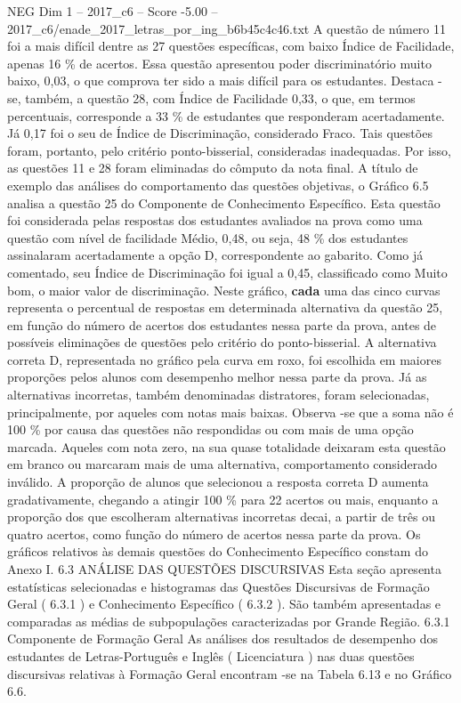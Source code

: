 \begin{textsample}{NEG Dim 1 – 2017\_c6 – Score -5.00 – 2017\_c6/enade\_2017\_letras\_por\_ing\_b6b45c4c46.txt}
A questão de número 11 foi a mais difícil dentre as 27 questões específicas, com baixo Índice de Facilidade, apenas 16 \% de acertos.
Essa questão apresentou poder discriminatório muito baixo, 0,03, o que comprova ter sido a mais difícil para os estudantes.
Destaca -se, também, a questão 28, com Índice de Facilidade 0,33, o que, em termos percentuais, corresponde a 33 \% de estudantes que responderam acertadamente.
Já 0,17 foi o seu de Índice de Discriminação, considerado Fraco.
Tais questões foram, portanto, pelo critério ponto-bisserial, consideradas inadequadas.
Por isso, as questões 11 e 28 foram eliminadas do cômputo da nota final.
A título de exemplo das análises do comportamento das questões objetivas, o Gráfico 6.5 analisa a questão 25 do Componente de Conhecimento Específico.
Esta questão foi considerada pelas respostas dos estudantes avaliados na prova como uma questão com nível de facilidade Médio, 0,48, ou seja, 48 \% dos estudantes assinalaram acertadamente a opção D, correspondente ao gabarito.
Como já comentado, seu Índice de Discriminação foi igual a 0,45, classificado como Muito bom, o maior valor de discriminação.
Neste gráfico, \textbf{cada} uma das cinco curvas representa o percentual de respostas em determinada alternativa da questão 25, em função do número de acertos dos estudantes nessa parte da prova, antes de possíveis eliminações de questões pelo critério do ponto-bisserial.
A alternativa correta D, representada no gráfico pela curva em roxo, foi escolhida em maiores proporções pelos alunos com desempenho melhor nessa parte da prova.
Já as alternativas incorretas, também denominadas distratores, foram selecionadas, principalmente, por aqueles com notas mais baixas.
Observa -se que a soma não é 100 \% por causa das questões não respondidas ou com mais de uma opção marcada.
Aqueles com nota zero, na sua quase totalidade deixaram esta questão em branco ou marcaram mais de uma alternativa, comportamento considerado inválido.
A proporção de alunos que selecionou a resposta correta D aumenta gradativamente, chegando a atingir 100 \% para 22 acertos ou mais, enquanto a proporção dos que escolheram alternativas incorretas decai, a partir de três ou quatro acertos, como função do número de acertos nessa parte da prova.
Os gráficos relativos às demais questões do Conhecimento Específico constam do Anexo I. 6.3 ANÁLISE DAS QUESTÕES DISCURSIVAS Esta seção apresenta estatísticas selecionadas e histogramas das Questões Discursivas de Formação Geral ( 6.3.1 ) e Conhecimento Específico ( 6.3.2 ).
São também apresentadas e comparadas as médias de subpopulações caracterizadas por Grande Região. 6.3.1 Componente de Formação Geral As análises dos resultados de desempenho dos estudantes de Letras-Português e Inglês ( Licenciatura ) nas duas questões discursivas relativas à Formação Geral encontram -se na Tabela 6.13 e no Gráfico 6.6.

\end{textsample}
